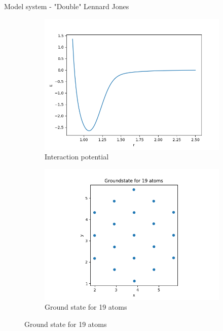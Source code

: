 \documentclass{beamer}
\begin{document}
\begin{frame}{Model system - "Double" Lennard Jones}
	\begin{figure}
		\centering
		\begin{subfigure}{0.5\textwidth}
			\centering
			\includegraphics[width=\linewidth]{doubleLJplot}
			\caption*{Interaction potential}
		\end{subfigure}%
		\begin{subfigure}{0.5\textwidth}
			\centering
			\includegraphics[width=\linewidth]{groundstateStructureN19}
			\caption*{Ground state for 19 atoms}
		\end{subfigure}
	\end{figure}
\end{frame}
\end{document}
